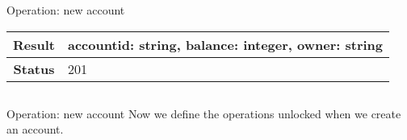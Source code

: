 \begin{frame}{Operation: new account}
  \centering
  \begin{tabular}{| c | l |}
    \hline
    \textbf{Result}    & accountid: string, balance: integer, owner: string\\ \hline
    \textbf{Status}    & 201 \\ \hline
  \end{tabular}
  \centering
  \inputminted{js}{./code/example2_new_account_response.jsch}
\end{frame}


\begin{frame}{Operation: new account}
  Now we define the operations unlocked when we create an account.

  \centering
  \inputminted{js}{./code/example2_new_account_links.jsch}
\end{frame}




